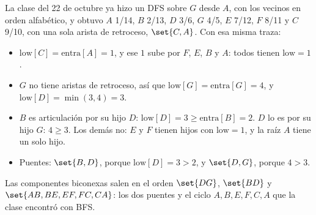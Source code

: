 \documentclass[11pt,letterpaper]{article}
\begin{document}
\begin{ejemplo}
  \label{ej:articulaciones-libreta}
  La clase del 22 de octubre ya hizo un DFS sobre $G$ desde $A$, con
  los vecinos en orden alfabético, y obtuvo $A$ 1/14, $B$ 2/13, $D$
  3/6, $G$ 4/5, $E$ 7/12, $F$ 8/11 y $C$ 9/10, con una sola arista de
  retroceso, $\set{C, A}$. Con esa misma traza:
  \begin{itemize}[itemsep=0.1em]
    \item $\text{low}[C] = \text{entra}[A] = 1$, y ese $1$ sube por
          $F$, $E$, $B$ y $A$: todos tienen $\text{low} = 1$.
    \item $G$ no tiene aristas de retroceso, así que
          $\text{low}[G] = \text{entra}[G] = 4$, y
          $\text{low}[D] = \min(3, 4) = 3$.
    \item $B$ es articulación por su hijo $D$:
          $\text{low}[D] = 3 \ge \text{entra}[B] = 2$. $D$ lo es por su
          hijo $G$: $4 \ge 3$. Los demás no: $E$ y $F$ tienen hijos con
          $\text{low} = 1$, y la raíz $A$ tiene un solo hijo.
    \item Puentes: $\set{B, D}$, porque $\text{low}[D] = 3 > 2$, y
          $\set{D, G}$, porque $4 > 3$.
  \end{itemize}
  Las componentes biconexas salen en el orden $\set{DG}$, $\set{BD}$ y
  $\set{AB, BE, EF, FC, CA}$: los dos puentes y el ciclo
  $A, B, E, F, C, A$ que la clase encontró con BFS.
  \begin{center}
  \hspace{1.6cm}
  \begin{tikzpicture}[baseline=(current bounding box.north),
    bloque/.style={line width=0.8cm, line cap=round, line join=round,
                   draw=#1, fill=#1}]

\end{tikzpicture}
\end{center}
\end{ejemplo}
\end{document}
